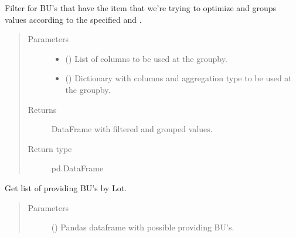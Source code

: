 \documentclass[letterpaper,10pt,english]{sphinxmanual}
\begin{document}
\begin{fulllineitems}

\begin{fulllineitems}
\label{\detokenize{source/optimization:optimization.solspace.SolutionSpace._get_bu_list}}
Filter for BU’s that have the item that we’re trying to optimize and
groups values according to the specified  and .
\begin{quote}\begin{description}
\item[{Parameters}] \leavevmode\begin{itemize}
\item {} 
 () \textendash{} List of columns to be used at the groupby.

\item {} 
 () \textendash{} Dictionary with columns and aggregation type to be used at the groupby.

\end{itemize}

\item[{Returns}] \leavevmode
{} \textendash{} DataFrame with filtered and grouped values.

\item[{Return type}] \leavevmode
pd.DataFrame

\end{description}\end{quote}

\end{fulllineitems}


\begin{fulllineitems}
\label{\detokenize{source/optimization:optimization.solspace.SolutionSpace._get_providing}}
Get list of providing BU’s by Lot.
\begin{quote}\begin{description}
\item[{Parameters}] \leavevmode
{} () \textendash{} Pandas dataframe with possible providing BU’s.


\end{description}
\end{quote}
\end{fulllineitems}
\end{fulllineitems}
\end{document}
